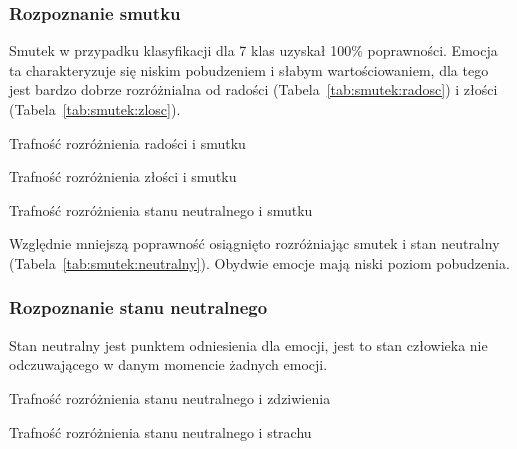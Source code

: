 \documentclass[a4paper,12pt,twoside,openany]{report}
\newcommand{\Tab}[1]{(Tabela~\ref{#1})}
\begin{document}
\subsubsection{Rozpoznanie smutku}
Smutek w przypadku klasyfikacji dla 7 klas uzyskał 100\% poprawności. 
Emocja ta charakteryzuje się niskim pobudzeniem i słabym wartościowaniem,
dla tego jest bardzo dobrze rozróżnialna od radości \Tab{tab:smutek:radosc} i złości \Tab{tab:smutek:zlosc}.
\begin{table}[hc!]
	\caption{Trafność rozróżnienia radości i smutku}
	\centering
	
	\label{tab:smutek:radosc}
\end{table}
\begin{table}[hc!]
	\caption{Trafność rozróżnienia złości i smutku}
	\centering
	
	\label{tab:smutek:zlosc}
\end{table}
\begin{table}[hc!]
	\caption{Trafność rozróżnienia stanu neutralnego i smutku}
	\centering
	
	\label{tab:smutek:neutralny}
\end{table}
Względnie mniejszą poprawność osiągnięto rozróżniając smutek i stan neutralny \Tab{tab:smutek:neutralny}.
Obydwie emocje mają niski poziom pobudzenia.
\subsubsection{Rozpoznanie stanu neutralnego}
Stan neutralny jest punktem odniesienia dla emocji, jest to stan człowieka nie odczuwającego w danym momencie żadnych emocji.
\begin{table}[hc!]
	\caption{Trafność rozróżnienia stanu neutralnego i zdziwienia}
	\centering
	
	\label{tab:neutralny:zdziwienie}
\end{table}
\begin{table}[hc!]
	\caption{Trafność rozróżnienia stanu neutralnego i strachu}
	\centering
	
	\label{tab:neutralny:strach}
\end{table}
\end{document}
